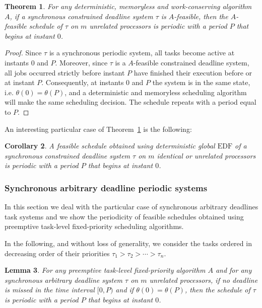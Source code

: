 \documentclass[a4paper,11pt]{article}
\newcommand{\EDF}{\textrm{EDF}}
\newtheorem{Theorem}{Theorem}
\newtheorem{Lemma}[Theorem]{Lemma}
\newtheorem{Corollary}[Theorem]{Corollary}
\begin{document}
\begin{Theorem}\label{synPer}
  For any deterministic, memoryless and work-conserving  algorithm $A$,
  if a synchronous constrained deadline system $\tau$ is $A$-feasible,
  then the $A$-feasible schedule of $\tau$ on $m$ unrelated processors
  is periodic with a period $P$ that begins at instant $0$.
\end{Theorem}

\begin{proof} 
  Since $\tau$ is a synchronous periodic system, all tasks become
  active at instants $0$ and $P$. Moreover, since $\tau$ is a
  $A$-feasible constrained deadline system, all jobs occurred strictly
  before instant $P$ have finished their execution before or at
  instant $P$. Consequently, at instants $0$ and $P$ the system is in
  the same state, i.e. $\theta(0)=\theta(P)$, and a deterministic and
  memoryless scheduling algorithm will make the same scheduling
  decision. The schedule repeats with a period equal to $P$.
\end{proof}

An interesting particular case of Theorem~\ref{synPer} is the following:

\begin{Corollary}\label{edfAll2} 
  A feasible schedule obtained using deterministic global {$\EDF$} of a
  synchronous constrained deadline system $\tau$ on $m$ identical or
  unrelated processors is periodic with a period $P$ that begins at
  instant $0$. 
\end{Corollary}


\subsubsection{Synchronous arbitrary deadline periodic
  systems} \label{synSectarb}

In this section we deal with the particular case of synchronous
arbitrary deadlines task systems and we show the periodicity of
feasible schedules obtained using preemptive task-level fixed-priority
scheduling algorithms.

In the following, and without loss of generality, we consider the tasks
ordered in decreasing order of their priorities $\tau_1 > \tau_2 >
\cdots > \tau_n$.

\begin{Lemma}\label{synPerLem} For any preemptive task-level fixed-priority
  algorithm $A$ and for any synchronous arbitrary deadline system $\tau$
  on $m$ unrelated processors, if no deadline is missed in the time interval
  $[0,P)$ and if $\theta(0)=\theta(P)$, then the schedule of $\tau$ is periodic with a period $P$ that begins at instant $0$.
\end{Lemma}
\end{document}
